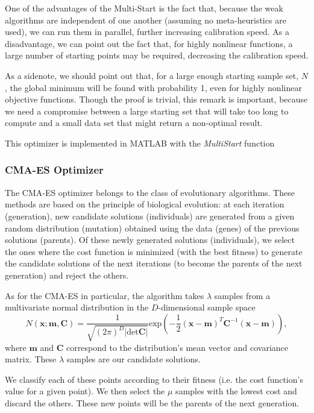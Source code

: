 One of the advantages of the Multi-Start is the fact that, because the weak algorithms are independent of one another (assuming no meta-heuristics are used), we can run them in parallel, further increasing calibration speed.
As a disadvantage, we can point out the fact that, for highly nonlinear functions, a large number of starting points may be required, decreasing the calibration speed.

As a sidenote, we should point out that, for a large enough starting sample set, $N$, the global minimum will be found with probability 1, even for highly nonlinear objective functions. Though the proof is trivial, this remark is important, because we need a compromise between a large starting set that will take too long to compute and a small data set that might return a non-optimal result.


This optimizer is implemented in MATLAB with the \emph{MultiStart} function~\cite{MATLABMS}

\subsubsection{CMA-ES Optimizer}
The CMA-ES optimizer belongs to the class of evolutionary algorithms. These methods are based on the principle of biological evolution: at each iteration (generation), new candidate solutions (individuals) are generated from a given random distribution (mutation) obtained using the data (genes) of the previous solutions (parents). Of these newly generated solutions (individuals), we select the ones where the cost function is minimized (with the best fitness) to generate the candidate solutions of the next iterations (to become the parents of the next generation) and reject the others.



As for the CMA-ES in particular, the algorithm takes $\lambda$ samples from a multivariate normal distribution in the $D$-dimensional sample space
\begin{equation}
N(\mathbf{x;m,C})=\frac{1}{\sqrt{(2\pi)^D|\mathrm{det}\mathbf{C}|}}\mathrm{exp}\left(-\frac{1}{2}(\mathbf{x}-\mathbf{m})^T\mathbf{C}^{-1}(\mathbf{x}-\mathbf{m})\right),
\end{equation}
\noindent where $\mathbf{m}$ and $\mathbf{C}$ correspond to the distribution's mean vector and covariance matrix.
These $\lambda$ samples are our candidate solutions.

We classify each of these points according to their fitness (i.e. the cost function's value for a given point). We then select the $\mu$ samples with the lowest cost and discard the others. These new points will be the parents of the next generation.

